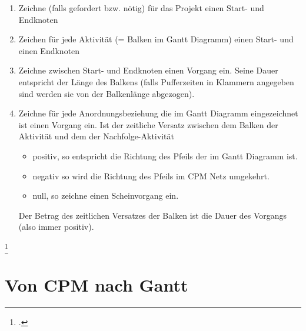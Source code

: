 \documentclass{lehramt-informatik}
\begin{document}
\begin{enumerate}

\item Zeichne (falls gefordert bzw. nötig) für das Projekt einen Start-
und Endknoten

\item Zeichen für jede Aktivität (= Balken im Gantt Diagramm) einen
Start- und einen Endknoten

\item Zeichne zwischen Start- und Endknoten einen Vorgang ein. Seine
Dauer entspricht der Länge des Balkens (falls Pufferzeiten in Klammern
angegeben sind werden sie von der Balkenlänge abgezogen).

\item Zeichne für jede Anordnungsbeziehung die im Gantt Diagramm
eingezeichnet ist einen Vorgang ein. Ist der zeitliche Versatz zwischen
dem Balken der Aktivität und dem der Nachfolge-Aktivität

\begin{itemize}
\item positiv, so entspricht die Richtung des Pfeils der im Gantt
Diagramm ist.

\item negativ so wird die Richtung des Pfeils im CPM Netz umgekehrt.

\item null, so zeichne einen Scheinvorgang ein.
\end{itemize}

Der Betrag des zeitlichen Versatzes der Balken ist die Dauer des
Vorgangs (also immer positiv).
\end{enumerate}

\footcite[Seite 35]{sosy:fs:3}

\section{Von CPM nach Gantt}
\end{document}
